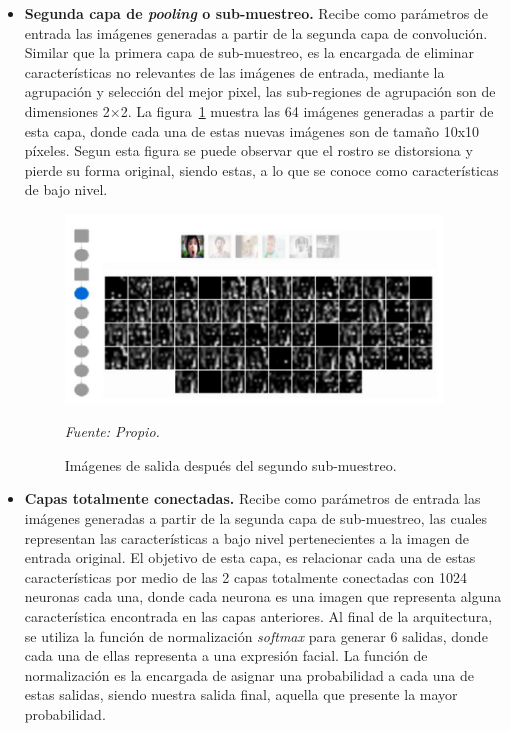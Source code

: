 \begin{itemize}
\item
{
\textbf{Segunda capa de \textit{pooling} o sub-muestreo.} Recibe como parámetros de entrada las imágenes generadas a partir de la segunda capa de convolución. Similar que la primera capa de sub-muestreo, es la encargada de eliminar características no relevantes de las imágenes de entrada, mediante la agrupación y selección del mejor pixel, las sub-regiones de agrupación son de dimensiones 2$\times$2. La figura~\ref{fig:filtro4} muestra las 64 imágenes generadas a partir de esta capa, donde cada una de estas nuevas imágenes son de tamaño 10x10 píxeles. Segun esta figura se puede observar que el rostro se distorsiona y pierde su forma original, siendo estas, a lo que se conoce como características de bajo nivel.
\begin{figure}[H]
		\centering
		\includegraphics[width=100mm]{Imagenes/filtro4.png}
		\caption{Imágenes de salida después del segundo sub-muestreo.}
		\vspace{0.15cm}
		\textit{Fuente: Propio.}
		\label{fig:filtro4}
\end{figure}
}
\item
{
\textbf{Capas totalmente conectadas.} Recibe como parámetros de entrada las imágenes generadas a partir de la segunda capa de sub-muestreo, las cuales representan las características a bajo nivel pertenecientes a la imagen de entrada original. El objetivo de esta capa, es relacionar cada una de estas características por medio de las 2 capas totalmente conectadas con 1024 neuronas cada una, donde cada neurona es una imagen que representa alguna característica encontrada en las capas anteriores. Al final de la arquitectura, se utiliza la función de normalización \textit{softmax} para generar 6 salidas, donde cada una de ellas representa a una expresión facial. La función de normalización es la encargada de asignar una probabilidad a cada una de estas salidas, siendo nuestra salida final, aquella que presente la mayor probabilidad.
}
\end{itemize}


